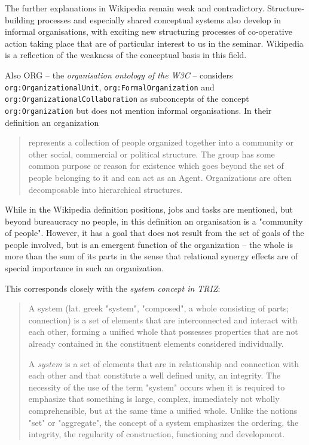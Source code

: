 \documentclass[11pt,a4paper]{article}
\begin{document}
The further explanations in Wikipedia remain weak and contradictory.
Structure-building processes and especially shared conceptual systems also
develop in informal organisations, with exciting new structuring processes
of co-operative action taking place that are of particular interest to us in
the seminar. Wikipedia is a reflection of the weakness of the conceptual basis
in this field.

Also ORG -- the \emph{organisation ontology of the W3C} \cite{vocab-org} --
considers \texttt{org:OrganizationalUnit}, \texttt{org:FormalOrganization} and
\texttt{org:OrganizationalCollaboration} as subconcepts of the concept
\texttt{org:Organization} but does not mention informal organisations.  In
their definition an organization
\begin{quote}
  represents a collection of people organized together into a community or
  other social, commercial or political structure. The group has some common
  purpose or reason for existence which goes beyond the set of people
  belonging to it and can act as an Agent. Organizations are often
  decomposable into hierarchical structures.~\cite{vocab-org}
\end{quote}

While in the Wikipedia definition positions, jobs and tasks are mentioned, but
beyond bureaucracy no people, in this definition an organisation is a
"community of people". However, it has a goal that does not result from the
set of goals of the people involved, but is an emergent function of the
organization -- the whole is more than the sum of its parts in the sense that
relational synergy effects are of special importance in such an organization.

This corresponds closely with the \emph{system concept in TRIZ}:
\begin{quote}
  A system (lat. greek "system", "composed", a whole consisting of parts;
  connection) is a set of elements that are interconnected and interact with
  each other, forming a unified whole that possesses properties that are not
  already contained in the constituent elements considered individually.
  \cite{Petrov2020}

  A \emph{system} is a set of elements that are in relationship and connection
  with each other and that constitute a well defined unity, an integrity. The
  necessity of the use of the term "system" occurs when it is required to
  emphasize that something is large, complex, immediately not wholly
  comprehensible, but at the same time a unified whole. Unlike the notions
  "set" or "aggregate", the concept of a system emphasizes the ordering, the
  integrity, the regularity of construction, functioning and development.
  \cite{TOP}
\end{quote}
\end{document}
